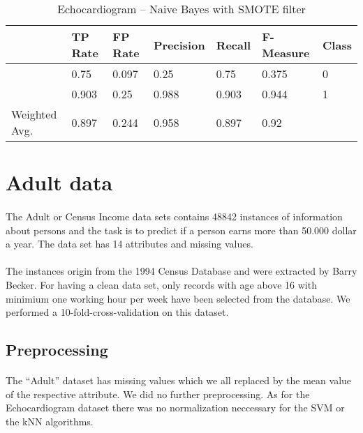 \documentclass[paper=a4, fontsize=11pt]{scrartcl} %
\numberwithin{equation}{section} %
\numberwithin{figure}{section} %
\numberwithin{table}{section} %
\begin{document}
\begin{table*}[htb]\centering
  \begin{tabular*}{\columnwidth}{@{}lllllll@{}}
      \toprule 
              &  TP Rate & FP Rate & Precision & Recall & F-Measure & Class    \\  \midrule
              &   0.75   & 0.097   & 0.25      & 0.75   & 0.375     & 0 \\
              &   0.903  & 0.25    & 0.988     & 0.903  & 0.944     & 1 \\
Weighted Avg. &   0.897  & 0.244   & 0.958     & 0.897  & 0.92      &   \\ \bottomrule
  \end{tabular*}
\caption{Echocardiogram -- Naive Bayes with SMOTE filter} 
\label{tab:echo:bayes:2d}
\end{table*}






\section{Adult data}

\paragraph{}The Adult or Census Income data sets contains 48842 instances of information about persons and the task is to predict if a person earns more than 50.000 dollar a year. The data set has 14 attributes and missing values.

\paragraph{}The instances origin from the 1994 Census Database and were extracted by Barry Becker. For having a clean data set, only records with age above 16 with minimium one working hour per week have been selected from the database. We performed a 10-fold-cross-validation on this dataset.

\subsection{Preprocessing}

\paragraph{}The ``Adult'' dataset has missing values which we all replaced by the mean value of the respective attribute. We did no further preprocessing. As for the Echocardiogram dataset there was no normalization neccessary for the SVM or the kNN algorithms.
\end{document}
